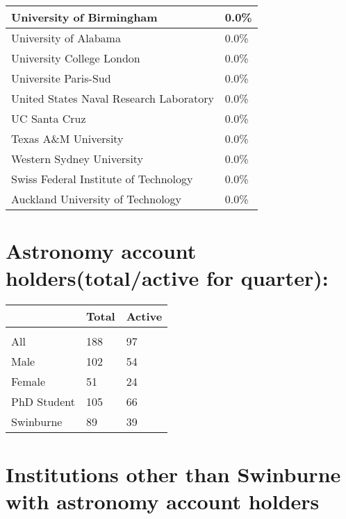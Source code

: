 \documentclass{article}%
\begin{document}
\begin{longtabu}{X[l] X[r]}
\hline%
University of Birmingham&0.0\%\\%
\hline%
University of Alabama&0.0\%\\%
\hline%
University College London&0.0\%\\%
\hline%
Universite Paris{-}Sud&0.0\%\\%
\hline%
United States Naval Research Laboratory&0.0\%\\%
\hline%
UC Santa Cruz&0.0\%\\%
\hline%
Texas A\&M University&0.0\%\\%
\hline%
Western Sydney University&0.0\%\\%
\hline%
Swiss Federal Institute of Technology&0.0\%\\%
\hline%
Auckland University of Technology&0.0\%\\%
\hline%
\end{longtabu}%
\section{Astronomy account holders(total/active for quarter): }%

%
\begin{longtabu}{X[l] X[r] X[r]}%
\textbf{}&\textbf{Total}&\textbf{Active}\\%
\hline%
&&\\%
All&188&97\\%
\hline%
Male&102&54\\%
\hline%
Female&51&24\\%
\hline%
PhD Student&105&66\\%
\hline%
Swinburne&89&39\\%
\hline%
\end{longtabu}%
\section{Institutions other than Swinburne with astronomy account holders}%
\end{document}
